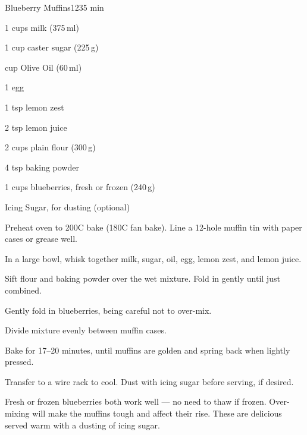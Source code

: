 \begin{recipebox}{Blueberry Muffins}{12}{35 min}
\begin{ingredients}
  \item 1 cups milk (375\,ml)
  \item 1 cup caster sugar (225\,g)
  \item {} cup Olive Oil (60\,ml)
  \item 1 egg
  \item 1 tsp lemon zest
  \item 2 tsp lemon juice
  \item 2 cups plain flour (300\,g)
  \item 4 tsp baking powder
  \item 1 cups blueberries, fresh or frozen (240\,g)
  \item Icing Sugar, for dusting (optional)
\end{ingredients}

\begin{method}
  \item Preheat oven to 200\degree C bake (180\degree C fan bake). Line a 12-hole muffin tin with paper cases or grease well.
  \item In a large bowl, whisk together milk, sugar, oil, egg, lemon zest, and lemon juice.
  \item Sift flour and baking powder over the wet mixture. Fold in gently until just combined.
  \item Gently fold in blueberries, being careful not to over-mix.
  \item Divide mixture evenly between muffin cases.
  \item Bake for 17–20 minutes, until muffins are golden and spring back when lightly pressed.
  \item Transfer to a wire rack to cool. Dust with icing sugar before serving, if desired.
\end{method}

\begin{notes}
Fresh or frozen blueberries both work well — no need to thaw if frozen.  
Over-mixing will make the muffins tough and affect their rise.  
These are delicious served warm with a dusting of icing sugar.  
\end{notes}
\end{recipebox}
